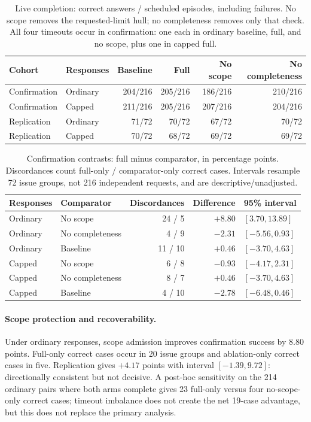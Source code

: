 \begin{table}[t]
\centering
\caption{Live completion: correct answers / scheduled episodes, including
failures. No scope removes the requested-limit hull; no completeness removes
only that check. All four timeouts occur in confirmation: one each in ordinary
baseline, full, and no scope, plus one in capped full.}
\label{tab:recovery-success}
\small
\setlength{\tabcolsep}{5pt}
\begin{tabular}{@{}llrrrr@{}}
\toprule
Cohort & Responses & Baseline & Full & No scope & No completeness \\
\midrule
Confirmation & Ordinary & 204/216 & 205/216 & 186/216 & 210/216 \\
Confirmation & Capped & 211/216 & 205/216 & 207/216 & 204/216 \\
Replication & Ordinary & 71/72 & 70/72 & 67/72 & 70/72 \\
Replication & Capped & 70/72 & 68/72 & 69/72 & 69/72 \\
\bottomrule
\end{tabular}
\end{table}

\begin{table}[t]
\centering
\caption{Confirmation contrasts: full minus comparator, in percentage points.
Discordances count full-only / comparator-only correct cases. Intervals resample
72 issue groups, not 216 independent requests, and are descriptive/unadjusted.}
\label{tab:recovery-contrasts}
\small
\begin{tabular}{@{}llrrl@{}}
\toprule
Responses & Comparator & Discordances & Difference & 95\% interval \\
\midrule
Ordinary & No scope & 24 / 5 & $+8.80$ & $[3.70,13.89]$ \\
Ordinary & No completeness & 4 / 9 & $-2.31$ & $[-5.56,0.93]$ \\
Ordinary & Baseline & 11 / 10 & $+0.46$ & $[-3.70,4.63]$ \\
Capped & No scope & 6 / 8 & $-0.93$ & $[-4.17,2.31]$ \\
Capped & No completeness & 8 / 7 & $+0.46$ & $[-3.70,4.63]$ \\
Capped & Baseline & 4 / 10 & $-2.78$ & $[-6.48,0.46]$ \\
\bottomrule
\end{tabular}
\end{table}

\paragraph{Scope protection and recoverability.}
Under ordinary responses, scope admission improves confirmation success by
8.80 points. Full-only correct cases occur in 20 issue groups and ablation-only
correct cases in five. Replication gives $+4.17$ points with interval
$[-1.39,9.72]$: directionally consistent but not decisive. A post-hoc sensitivity
on the 214 ordinary pairs where both arms complete gives 23 full-only versus
four no-scope-only correct cases; timeout imbalance does not create the net
19-case advantage, but this does not replace the primary analysis.

